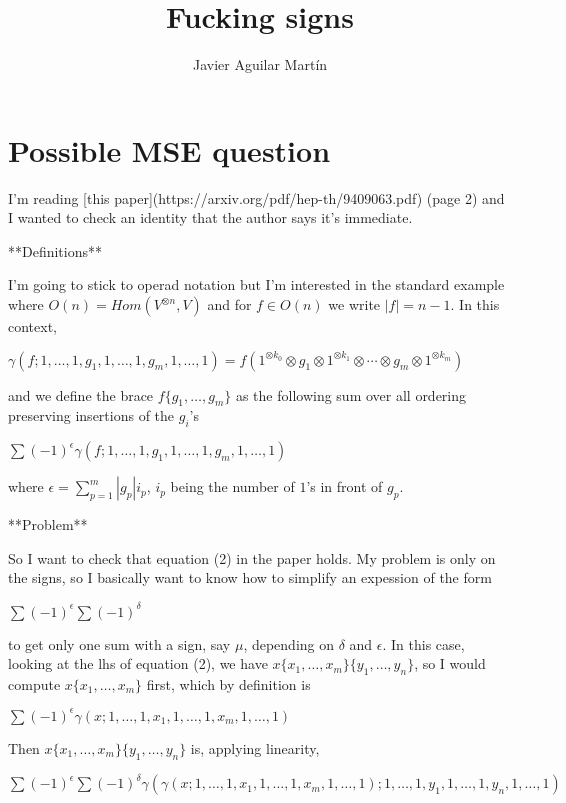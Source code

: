 \documentclass[twoside]{article}
\begin{document}
\title{Fucking signs}
\author{Javier Aguilar Martín}
\maketitle

\section{Possible MSE question}

I'm reading [this paper](https://arxiv.org/pdf/hep-th/9409063.pdf) (page 2) and I wanted to check an identity that the author says it's immediate. 

**Definitions**

I'm going to stick to operad notation but I'm interested in the standard example where $O(n)=Hom(V^{\otimes n},V)$ and for $f\in O(n)$ we write $|f|=n-1$. In this context, 

$\gamma(f;1,\dots,1,g_1,1,\dots, 1, g_m,1,\dots, 1)=f(1^{\otimes k_0}\otimes g_1\otimes 1^{\otimes k_1}\otimes\cdots\otimes g_m\otimes 1^{\otimes k_m})$

and we define the brace $f\{g_1,\dots,g_m\}$ as the following sum over all ordering preserving insertions of the $g_i$'s

$\sum (-1)^\epsilon \gamma(f;1,\dots,1,g_1,1,\dots, 1, g_m,1,\dots, 1)$

where $\epsilon=\sum_{p=1}^m|g_p|i_p$, $i_p$ being the number of $1$'s in front of $g_p$.

**Problem**

So I want to check that equation (2) in the paper holds. My problem is only on the signs, so I basically want to know how to simplify an expession of the form

$\sum (-1)^\epsilon\sum (-1)^\delta$

to get only one sum with a sign, say $\mu$, depending on $\delta$ and $\epsilon$. In this case, looking at the lhs of equation (2), we have $x\{x_1,\dots, x_m\}\{y_1,\dots, y_n\}$, so I would compute $x\{x_1,\dots, x_m\}$ first, which by definition is

$\sum (-1)^\epsilon \gamma(x;1,\dots,1,x_1,1,\dots, 1, x_m,1,\dots, 1)$

Then $x\{x_1,\dots, x_m\}\{y_1,\dots, y_n\}$ is, applying linearity, 

$\sum (-1)^\epsilon \sum(-1)^\delta\gamma(\gamma(x;1,\dots,1,x_1,1,\dots, 1, x_m,1,\dots, 1); 1,\dots, 1,y_1,1,\dots,1,y_n,1,\dots,1)$
\end{document}
